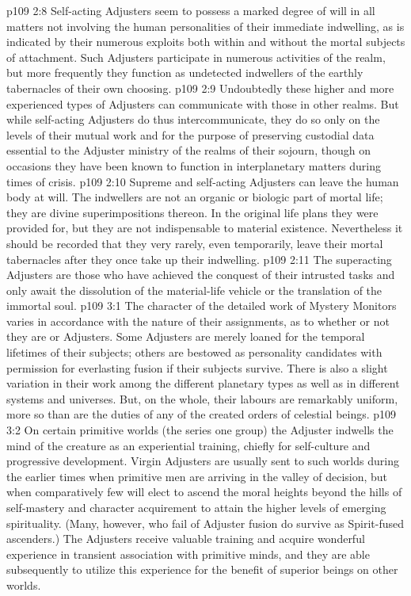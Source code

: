 \vs p109 2:8 \pc Self\hyp{}acting Adjusters seem to possess a marked degree of will in all matters not involving the human personalities of their immediate indwelling, as is indicated by their numerous exploits both within and without the mortal subjects of attachment. Such Adjusters participate in numerous activities of the realm, but more frequently they function as undetected indwellers of the earthly tabernacles of their own choosing.
\vs p109 2:9 Undoubtedly these higher and more experienced types of Adjusters can communicate with those in other realms. But while self\hyp{}acting Adjusters do thus intercommunicate, they do so only on the levels of their mutual work and for the purpose of preserving custodial data essential to the Adjuster ministry of the realms of their sojourn, though on occasions they have been known to function in interplanetary matters during times of crisis.
\vs p109 2:10 Supreme and self\hyp{}acting Adjusters can leave the human body at will. The indwellers are not an organic or biologic part of mortal life; they are divine superimpositions thereon. In the original life plans they were provided for, but they are not indispensable to material existence. Nevertheless it should be recorded that they very rarely, even temporarily, leave their mortal tabernacles after they once take up their indwelling.
\vs p109 2:11 The superacting Adjusters are those who have achieved the conquest of their intrusted tasks and only await the dissolution of the material\hyp{}life vehicle or the translation of the immortal soul.
\vs p109 3:1 The character of the detailed work of Mystery Monitors varies in accordance with the nature of their assignments, as to whether or not they are  or  Adjusters. Some Adjusters are merely loaned for the temporal lifetimes of their subjects; others are bestowed as personality candidates with permission for everlasting fusion if their subjects survive. There is also a slight variation in their work among the different planetary types as well as in different systems and universes. But, on the whole, their labours are remarkably uniform, more so than are the duties of any of the created orders of celestial beings.
\vs p109 3:2 On certain primitive worlds (the series one group) the Adjuster indwells the mind of the creature as an experiential training, chiefly for self\hyp{}culture and progressive development. Virgin Adjusters are usually sent to such worlds during the earlier times when primitive men are arriving in the valley of decision, but when comparatively few will elect to ascend the moral heights beyond the hills of self\hyp{}mastery and character acquirement to attain the higher levels of emerging spirituality. (Many, however, who fail of Adjuster fusion do survive as Spirit\hyp{}fused ascenders.) The Adjusters receive valuable training and acquire wonderful experience in transient association with primitive minds, and they are able subsequently to utilize this experience for the benefit of superior beings on other worlds. 
